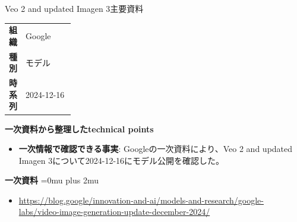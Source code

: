 \begin{technicalnote}{Veo 2 and updated Imagen 3}{主要資料}
\begingroup
\begin{tabularx}{\linewidth}{@{}>{\bfseries}p{0.22\linewidth}X@{}}
組織 & Google \\
種別 & モデル \\
時系列 & 2024-12-16 \\
\end{tabularx}
\smallskip
{\bfseries 一次資料から整理したtechnical points}
\begin{itemize}[leftmargin=1.5em,itemsep=0.35em]
\item \textbf{一次情報で確認できる事実}: Googleの一次資料により、Veo 2 and updated Imagen 3について2024-12-16にモデル公開を確認した。
\end{itemize}
\begin{minipage}{\linewidth}
\begin{samepage}
{\bfseries 一次資料}
\begingroup\sloppy
\Urlmuskip=0mu plus 2mu\relax
\begin{itemize}[leftmargin=1.5em,itemsep=0.25em]
\item {\scriptsize\url{https://blog.google/innovation-and-ai/models-and-research/google-labs/video-image-generation-update-december-2024/}}
\end{itemize}
\endgroup
\end{samepage}
\end{minipage}
\endgroup
\end{technicalnote}
\medskip


